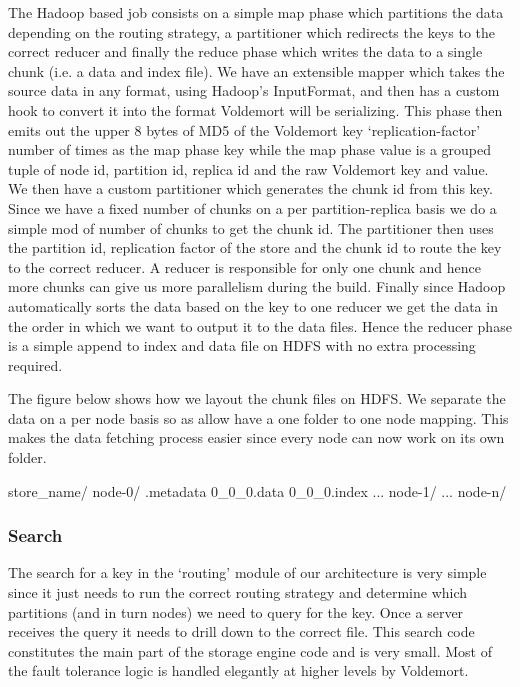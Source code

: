 \documentclass[10pt,twocolumn,preprint,natbib,authoryear]{sigplanconf}
\begin{document}
The Hadoop based job consists on a simple map phase which partitions the data depending on the routing strategy, a partitioner which redirects the keys to the correct reducer and finally the reduce phase which writes the data to a single chunk (i.e. a data and index file). We have an extensible mapper which takes the source data in any format, using Hadoop's InputFormat, and then has a custom hook to convert it into the format Voldemort will be serializing. This phase then emits out the upper 8 bytes of MD5 of the Voldemort key `replication-factor' number of times as the map phase key while the map phase value is a grouped tuple of node id, partition id, replica id and the raw Voldemort key and value. We then have a custom partitioner which generates the chunk id from this key. Since we have a fixed number of chunks on a per partition-replica basis we do a simple mod of number of chunks to get the chunk id. The partitioner then uses the partition id, replication factor of the store and the chunk id to route the key to the correct reducer. A reducer is responsible for only one chunk and hence more chunks can give us more parallelism during the build. Finally since Hadoop automatically sorts the data based on the key to one reducer we get the data in the order in which we want to output it to the data files. Hence the reducer phase is a simple append to index and data file on HDFS with no extra processing required.  

The figure below shows how we layout the chunk files on HDFS. We separate the data on a per node basis so as allow have a one folder to one node mapping. This makes the data fetching process easier since every node can now work on its own folder. 

\scriptsize
\begin{verbatimtab}
store_name/
  node-0/
    .metadata
    0_0_0.data
    0_0_0.index
    ...
  node-1/
  ...
  node-n/
\end{verbatimtab}
\normalsize


\subsubsection{Search}
\label{sec:read_only:search}

The search for a key in the `routing' module of our architecture is very simple since it just needs to run the correct routing strategy and determine which partitions (and in turn nodes) we need to query for the key. Once a server receives the query it needs to drill down to the correct file. This search code constitutes the main part of the storage engine code and is very small. Most of the fault tolerance logic is handled elegantly at higher levels by Voldemort.
\end{document}
